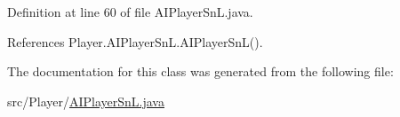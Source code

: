 Definition at line 60 of file A\+I\+Player\+Sn\+L.\+java.



References Player.\+A\+I\+Player\+Sn\+L.\+A\+I\+Player\+Sn\+L().



The documentation for this class was generated from the following file\+:\begin{DoxyCompactItemize}
\item 
src/\+Player/\hyperlink{_a_i_player_sn_l_8java}{A\+I\+Player\+Sn\+L.\+java}\end{DoxyCompactItemize}
